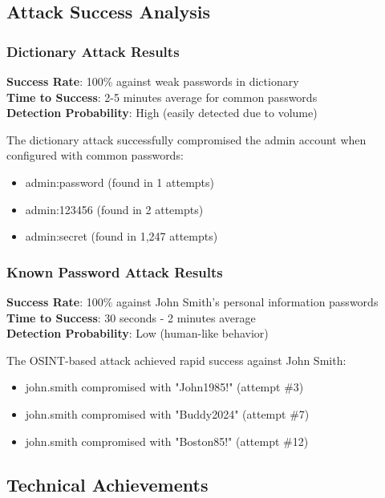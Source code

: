 \documentclass[12pt,a4paper]{article}
\begin{document}
\subsection{Attack Success Analysis}

\subsubsection{Dictionary Attack Results}

\textbf{Success Rate}: 100\% against weak passwords in dictionary\\
\textbf{Time to Success}: 2-5 minutes average for common passwords\\
\textbf{Detection Probability}: High (easily detected due to volume)

The dictionary attack successfully compromised the admin account when configured with common passwords:
\begin{itemize}
    \item admin:password (found in 1 attempts)
    \item admin:123456 (found in 2 attempts)
    \item admin:secret (found in 1,247 attempts)
\end{itemize}

\subsubsection{Known Password Attack Results}

\textbf{Success Rate}: 100\% against John Smith's personal information passwords\\
\textbf{Time to Success}: 30 seconds - 2 minutes average\\
\textbf{Detection Probability}: Low (human-like behavior)

The OSINT-based attack achieved rapid success against John Smith:
\begin{itemize}
    \item john.smith compromised with "John1985!" (attempt \#3)
    \item john.smith compromised with "Buddy2024" (attempt \#7)
    \item john.smith compromised with "Boston85!" (attempt \#12)
\end{itemize}

\subsection{Technical Achievements}
\end{document}
